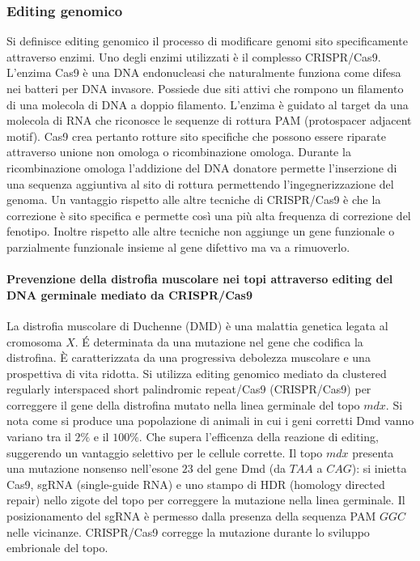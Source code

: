 		\subsubsection{Editing genomico}
		Si definisce editing genomico il processo di modificare genomi sito specificamente attraverso enzimi. 
		Uno degli enzimi utilizzati \`e il complesso CRISPR/Cas9. 
		L'enzima Cas9 \`e una DNA endonucleasi che naturalmente funziona come difesa nei batteri per DNA invasore. 
		Possiede due siti attivi che rompono un filamento di una molecola di DNA a doppio filamento. 
		L'enzima \`e guidato al target da una molecola di RNA che riconosce le sequenze di rottura PAM (protospacer adjacent motif). 
		Cas9 crea pertanto rotture sito specifiche che possono essere riparate attraverso unione non omologa o ricombinazione omologa. 
		Durante la ricombinazione omologa l'addizione del DNA donatore permette l'inserzione di una sequenza aggiuntiva al sito di rottura permettendo l'ingegnerizzazione del genoma. 
		Un vantaggio rispetto alle altre tecniche di CRISPR/Cas9 \`e che la correzione \`e sito specifica e permette cos\`i una pi\`u alta frequenza di correzione del fenotipo. 
		Inoltre rispetto alle altre tecniche non aggiunge un gene funzionale o parzialmente funzionale insieme al gene difettivo ma va a rimuoverlo. 

			\paragraph{Prevenzione della distrofia muscolare nei topi attraverso editing del DNA germinale mediato da CRISPR/Cas9}
			La distrofia muscolare di Duchenne (DMD) \`e una malattia genetica legata al cromosoma $X$. 
			\'E determinata da una mutazione nel gene che codifica la distrofina. 
			\`E caratterizzata da una progressiva debolezza muscolare e una prospettiva di vita ridotta. 
			Si utilizza editing genomico mediato da clustered regularly interspaced short palindromic repeat/Cas9 (CRISPR/Cas9) per correggere il gene della distrofina mutato nella linea germinale del topo $mdx$. 
			Si nota come si produce una popolazione di animali in cui i geni corretti Dmd vanno variano tra il $2\%$ e il $100\%$. 
			Che supera l'efficenza della reazione di editing, suggerendo un vantaggio selettivo per le cellule corrette. 
			Il topo $mdx$ presenta una mutazione nonsenso nell'esone $23$ del gene Dmd (da $TAA$ a $CAG$): si inietta Cas9, sgRNA (single-guide RNA) e uno stampo di HDR (homology directed repair) nello zigote del topo per correggere la mutazione nella linea germinale. 
			Il posizionamento del sgRNA \`e permesso dalla presenza della sequenza PAM $GGC$ nelle vicinanze. 
			CRISPR/Cas9 corregge la mutazione durante lo sviluppo embrionale del topo. 

